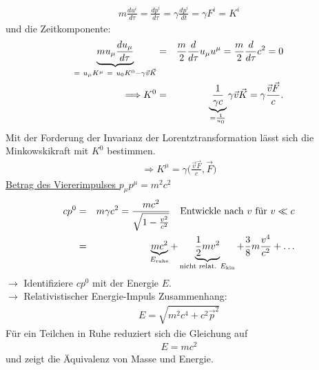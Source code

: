 \begin{eqnarray*} m \frac {du^i}{d\tau} = \frac{dp^i}{d\tau} = \gamma \frac{dp^i}{d t} = \gamma F^i = K^i \end{eqnarray*}
und die Zeitkomponente:
\begin{eqnarray*} 
\underbrace{  m  u_{\mu} \frac{d u_{\mu}}{d\tau}}_{ = \ u_{\mu} K^{\mu}\ = \ u_0K^0 - \gamma\vec v\vec K} \g \frac m 2 \frac{d}{d \tau} u_{\mu}u^{\mu} = \frac m 2 \frac{d}{d\tau} c^2 = 0\\
\Longrightarrow K^0 \g \underbrace{\frac 1 {\gamma c}}_{= \frac 1 {u_0}} \gamma \vec v\vec K = \gamma \frac{\vec v\vec F} c.
\end{eqnarray*}
Mit der Forderung der Invarianz der Lorentztransformation lässt sich die Minkowskikraft mit $K^0$ bestimmen.
\begin{eqnarray*} \Longrightarrow K^{\mu} = \gamma \Big( \frac{\vec v\vec F}c , \vec F\Big )\end{eqnarray*}
\underline{Betrag des Viererimpulses $ p_{\mu}p^{\mu} = m^2 c^2$}\\
\begin{eqnarray*} 
cp^0 &=& m\gamma c^2 = \frac{mc^2}{\sqrt{1 - \frac {v^2}{c^2}}} \quad\text{Entwickle nach $v$ für }v\ll c\\
&=& \underbrace{mc^2}_{E_{\text{ruhe}}} + \underbrace{\frac 1 2m v^2 }_{\text{nicht relat. }E_{\text{kin}} } + \frac 3 8 m \frac{v^4}{c^2} + \dots
\end{eqnarray*}
$\longrightarrow$ Identifiziere $cp^0$ mit der Energie $E$.\\
$\longrightarrow$ Relativistischer Energie-Impuls Zusammenhang:
\begin{eqnarray*} \boxed{ E = \sqrt{m^2c^4 + c^2\vec p^2}}\end{eqnarray*}
Für ein Teilchen in Ruhe reduziert sich die Gleichung auf
\begin{eqnarray*} \boxed{E = mc^2}\end{eqnarray*}
und zeigt die Äquivalenz von Masse und Energie.


